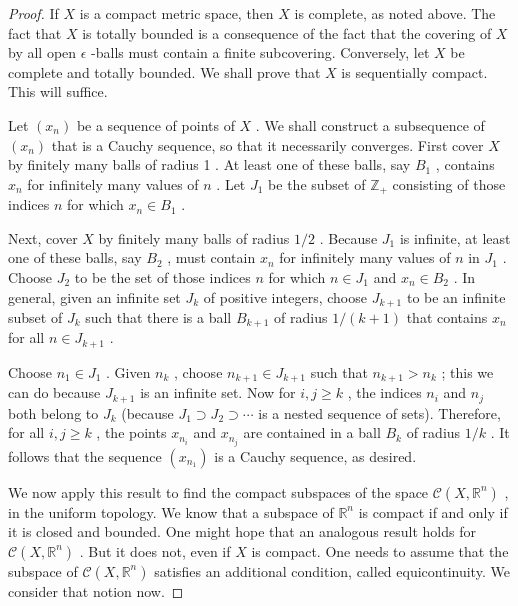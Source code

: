 \begin{proof}If \(X\) is a compact metric space, then \(X\) is complete, as noted above. The fact that \(X\) is totally bounded is a consequence of the fact that the covering of \(X\) by all open \(\epsilon\) -balls must contain a finite subcovering.
Conversely, let \(X\) be complete and totally bounded. We shall prove that \(X\) is sequentially compact. This will suffice.

Let \(\left( {x}_{n}\right)\) be a sequence of points of \(X\) . We shall construct a subsequence of \(\left( {x}_{n}\right)\) that is a Cauchy sequence, so that it necessarily converges. First cover \(X\) by finitely many balls of radius 1 . At least one of these balls, say \({B}_{1}\) , contains \({x}_{n}\) for infinitely many values of \(n\) . Let \({J}_{1}\) be the subset of \({\mathbb{Z}}_{ + }\) consisting of those indices \(n\) for which \({x}_{n} \in  {B}_{1}\) .

Next, cover \(X\) by finitely many balls of radius \(1/2\) . Because \({J}_{1}\) is infinite, at least one of these balls, say \({B}_{2}\) , must contain \({x}_{n}\) for infinitely many values of \(n\) in \({J}_{1}\) . Choose \({J}_{2}\) to be the set of those indices \(n\) for which \(n \in  {J}_{1}\) and \({x}_{n} \in  {B}_{2}\) . In general, given an infinite set \({J}_{k}\) of positive integers, choose \({J}_{k + 1}\) to be an infinite subset of \({J}_{k}\) such that there is a ball \({B}_{k + 1}\) of radius \(1/\left( {k + 1}\right)\) that contains \({x}_{n}\) for all \(n \in  {J}_{k + 1}\) .

Choose \({n}_{1} \in  {J}_{1}\) . Given \({n}_{k}\) , choose \({n}_{k + 1} \in  {J}_{k + 1}\) such that \({n}_{k + 1} > {n}_{k}\) ; this we can do because \({J}_{k + 1}\) is an infinite set. Now for \(i,j \geq  k\) , the indices \({n}_{i}\) and \({n}_{j}\) both belong to \({J}_{k}\) (because \({J}_{1} \supset  {J}_{2} \supset  \cdots\) is a nested sequence of sets). Therefore, for all \(i,j \geq  k\) , the points \({x}_{{n}_{i}}\) and \({x}_{{n}_{j}}\) are contained in a ball \({B}_{k}\) of radius \(1/k\) . It follows that the sequence \(\left( {x}_{{n}_{1}}\right)\) is a Cauchy sequence, as desired.

We now apply this result to find the compact subspaces of the space \(\mathcal{C}\left( {X,{\mathbb{R}}^{n}}\right)\) , in the uniform topology. We know that a subspace of \({\mathbb{R}}^{n}\) is compact if and only if it is closed and bounded. One might hope that an analogous result holds for \(\mathcal{C}\left( {X,{\mathbb{R}}^{n}}\right)\) . But it does not, even if \(X\) is compact. One needs to assume that the subspace of \(\mathcal{C}\left( {X,{\mathbb{R}}^{n}}\right)\) satisfies an additional condition, called equicontinuity. We consider that notion now.
\end{proof}
